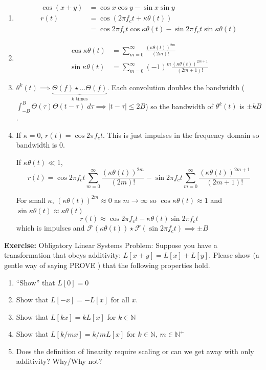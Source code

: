 \documentclass[12pt]{article}
\newcommand{\N}{\mathbb{N}}
\newcommand{\abs}[1]{\left\vert #1 \right\vert}
\newcommand{\F}{\mathcal{F}}
\newenvironment*{exercise}[1][red]{
    \begin{tcolorbox}[
        parbox=false,
        colback=#1!5!white,
        colframe=#1!75!black,
        breakable
    ]}
    {\end{tcolorbox}}
\begin{document}
\begin{enumerate}
    \item \begin{align*}
        \cos(x + y) &= \cos x \cos y - \sin x \sin y\\ 
        r(t) &= \cos(2\pi f_c t + \kappa \theta(t))\\ 
        &= \cos 2\pi f_c t \cos \kappa \theta(t) - \sin 2\pi f_c t \sin \kappa \theta(t)
    \end{align*}

    \item \begin{align*}
            \cos \kappa \theta(t) &= \sum_{m=0}^{\infty} \frac{(\kappa \theta(t))^{2m}}{(2m)!}\\
            \sin \kappa \theta(t) &= \sum_{m=0}^{\infty} (-1)^m \frac{(\kappa \theta(t))^{2m+1}}{(2m + 1)!}
        \end{align*}

    \item $\theta^k(t) \implies \underbrace{\Theta(f) \star \dots \Theta(f)}_{k \text{ times}}$. Each convolution doubles the bandwidth ($\int_{-B}^B \Theta(\tau) \Theta(t - \tau)\; d\tau \implies \abs{t - \tau} \leq 2B$) so the bandwidth of $\theta^k(t)$ is $\pm kB$.
    
    \item If $\kappa = 0$, $r(t) = \cos 2\pi f_c t$. This is just impulses in the frequency domain so bandwidth is $0$. 
    
    If $\kappa \theta(t) \ll 1$, 
    \[r(t) = \cos 2\pi f_c t \sum_{m=0}^{\infty} \frac{(\kappa\theta(t))^{2m}}{(2m)!} - \sin 2\pi f_c t \sum_{m=0}^{\infty}\frac{(\kappa \theta(t))^{2m + 1}}{(2m + 1)!}\] 
    
    For small $\kappa$, $(\kappa\theta(t))^{2m} \approx 0$ as $m \to \infty$ so $\cos \kappa \theta(t) \approx 1$ and $\sin \kappa \theta(t) \approx \kappa \theta(t)$ 
    \[r(t) \approx \cos 2\pi f_c t - \kappa \theta(t)\sin 2\pi f_c t\]
    which is impulses and $\F(\kappa \theta(t)) \star \F(\sin 2\pi f_c t) \implies \pm B$
\end{enumerate}

\begin{exercise}
    \textbf{Exercise:} Obligatory Linear Systems Problem: Suppose you have a transformation that
obeys additivity: $L[x + y] = L[x] + L[y]$. Please show (a gentle way of saying PROVE )
that the following properties hold.
\begin{enumerate}
    \item “Show” that $L[0] = 0 $
    \item Show that $L[-x] = -L[x]$ for all $x$.
    \item Show that $L[kx] = kL[x]$ for $k \in \N$ 
    \item Show that $L[k/m x] = k/m L[x]$ for $k \in \N$, $m \in \N^+$
    \item Does the definition of linearity require scaling or can we get away with only additivity? Why/Why not?
\end{enumerate}
\end{exercise}
\end{document}
